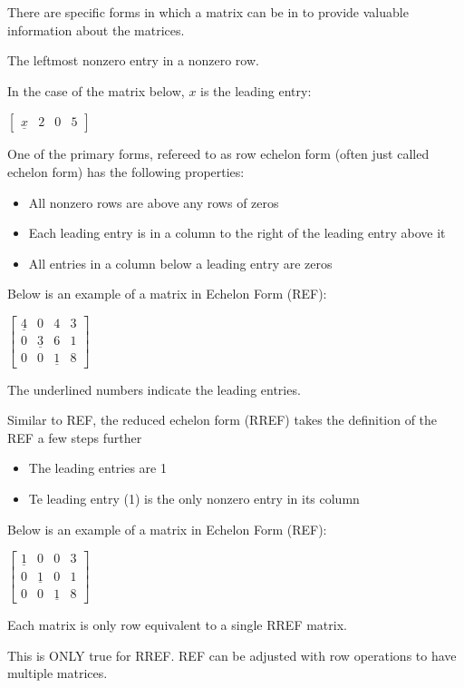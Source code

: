 \documentclass{report}
\begin{document}
There are specific forms in which a matrix can be in to provide valuable information about the matrices.
\begin{definition}
	The leftmost nonzero entry in a nonzero row.
\end{definition}
In the case of the matrix below, $x$ is the leading entry:
\begin{center}
	$\begin{bmatrix}
		\underline{x} & 2 & 0 & 5
	\end{bmatrix}$	
\end{center}
\begin{definition}
	One of the primary forms, refereed to as row echelon form (often just called echelon form) has the following properties:
	\begin{itemize}
		\item All nonzero rows are above any rows of zeros
		\item Each leading entry is in a column to the right of the leading entry above it
		\item All entries in a column below a leading entry are zeros
	\end{itemize}
\end{definition}
Below is an example of a matrix in Echelon Form (REF):
\begin{center}
	$\begin{bmatrix}
	\underline{4} & 0 & 4 & 3 \\
	0 & \underline{3} & 6 & 1 \\
	0 & 0 & \underline{1} & 8 
	\end{bmatrix}$
\end{center}
The underlined numbers indicate the leading entries.
\begin{definition}
	Similar to REF, the reduced echelon form (RREF) takes the definition of the REF a few steps further
	\begin{itemize}
		\item The leading entries are 1
		\item Te leading entry (1) is the only nonzero entry in its column
	\end{itemize}
\end{definition}
Below is an example of a matrix in Echelon Form (REF):
\begin{center}
	$\begin{bmatrix}
	\underline{1} & 0 & 0 & 3 \\
	0 & \underline{1} & 0 & 1 \\
	0 & 0 & \underline{1} & 8 
	\end{bmatrix}$
\end{center}
\begin{theorem}
	Each matrix is only row equivalent to a single RREF matrix.
\end{theorem}
This is ONLY true for RREF. REF can be adjusted with row operations to have multiple matrices.
\end{document}

